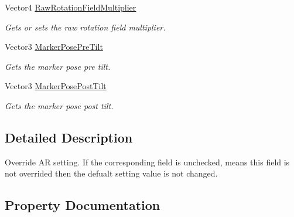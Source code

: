 \begin{DoxyCompactItemize}
Vector4 \mbox{\hyperlink{class_ximmerse_1_1_slide_in_s_d_k_1_1_override_a_r_setting_a2f2017fcabc93e71d0888a5417714e26}{Raw\+Rotation\+Field\+Multiplier}}
\begin{DoxyCompactList}\small\item\em Gets or sets the raw rotation field multiplier. \end{DoxyCompactList}\item 
Vector3 \mbox{\hyperlink{class_ximmerse_1_1_slide_in_s_d_k_1_1_override_a_r_setting_a3607243c89dc175ca52de381dc234855}{Marker\+Pose\+Pre\+Tilt}}
\begin{DoxyCompactList}\small\item\em Gets the marker pose pre tilt. \end{DoxyCompactList}\item 
Vector3 \mbox{\hyperlink{class_ximmerse_1_1_slide_in_s_d_k_1_1_override_a_r_setting_a186411c194a4e421bd56b4d92d209b06}{Marker\+Pose\+Post\+Tilt}}
\begin{DoxyCompactList}\small\item\em Gets the marker pose post tilt. \end{DoxyCompactList}\end{DoxyCompactItemize}


\subsection{Detailed Description}
Override AR setting. If the corresponding field is unchecked, means this field is not overrided then the defualt setting value is not changed. 



\subsection{Property Documentation}
\mbox{\label{class_ximmerse_1_1_slide_in_s_d_k_1_1_override_a_r_setting_aa4b86d59d748b1be87ed68d20d503fad}} 
